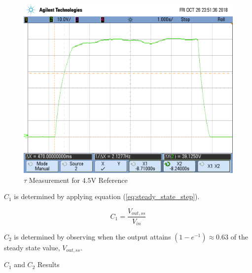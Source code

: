 \FloatBarrier

\FloatBarrier

\begin{figure}[h!]
	\centering
	\includegraphics[scale=0.75]{../images/scope_16.PNG}
	\caption{$\tau$ Measurement for $4.5$\si{\volt} Reference}
	\label{fig:scope_16}
\end{figure}

\FloatBarrier

$C_1$ is determined by applying equation (\ref{eq:steady_state_step}).

\begin{equation}
	\label{eq:solve_for_steady_state}
	C_1 = \frac{ V_{out,ss} }{ V_{in} }
\end{equation}

$C_2$ is determined by observing when the output attains $(1-e^{-1}) \approx 0.63$ of the steady state value, $V_{out,ss}$.

\FloatBarrier

\begin{table}[h!]
	\centering
	\caption{$C_1$ and $C_2$ Results}
	\label{tab:prob_2}
\end{table}

\FloatBarrier
